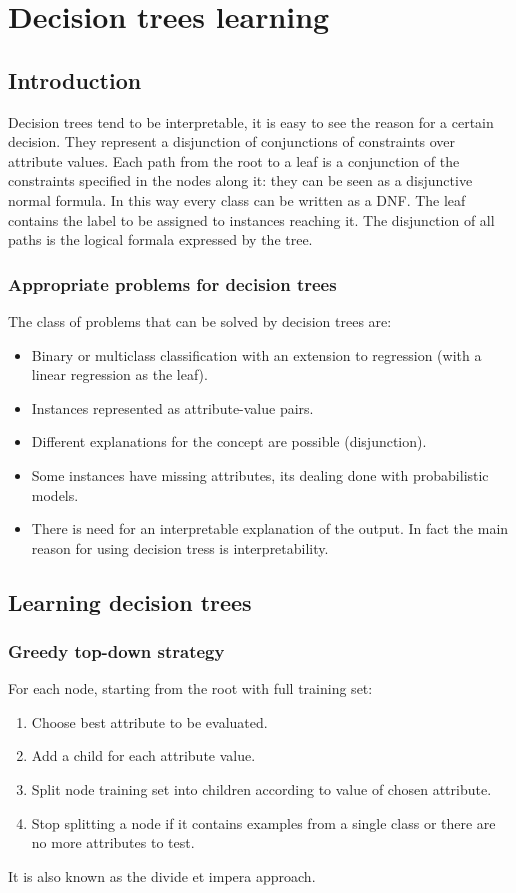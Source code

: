 \chapter{Decision trees learning}

\section{Introduction}
Decision trees tend to be interpretable, it is easy to see the reason for a certain decision.
They represent a disjunction of conjunctions of constraints over attribute values.
Each path from the root to a leaf is a conjunction of the constraints specified in the nodes along it: they can be seen as a disjunctive normal formula.
In this way every class can be written as a DNF.
The leaf contains the label to be assigned to instances reaching it.
The disjunction of all paths is the logical formala expressed by the tree.

	\subsection{Appropriate problems for decision trees}
	The class of problems that can be solved by decision trees are:
	\begin{itemize}
		\item Binary or multiclass classification with an extension to regression (with a linear regression as the leaf).
		\item Instances represented as attribute-value pairs.
		\item Different explanations for the concept are possible (disjunction).
		\item Some instances have missing attributes, its dealing done with probabilistic models.
		\item There is need for an interpretable explanation of the output. 
			In fact the main reason for using decision tress is interpretability.
	\end{itemize}

\section{Learning decision trees}

	\subsection{Greedy top-down strategy}
	For each node, starting from the root with full training set:
	\begin{enumerate}
		\item Choose best attribute to be evaluated.
		\item Add a child for each attribute value.
		\item Split node training set into children according to value of chosen attribute.
		\item Stop splitting a node if it contains examples from a single class or there are no more attributes to test.
	\end{enumerate}
	It is also known as the divide et impera approach.

